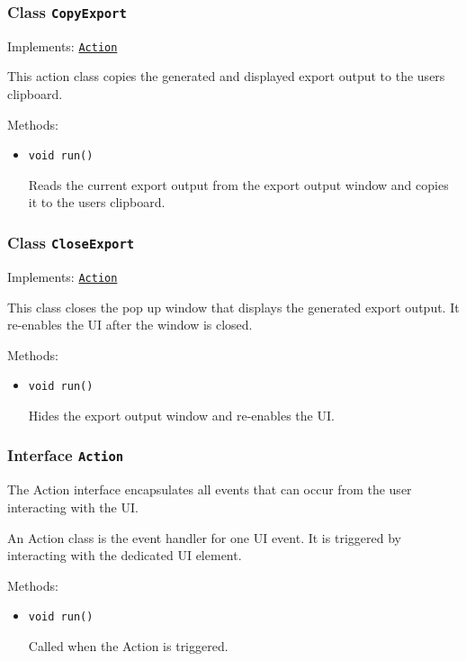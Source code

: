 \subsubsection{Class \texttt{CopyExport}}
\label{type:edu.kit.wavelength.client.view.action.CopyExport}
Implements: \texttt{\hyperref[type:edu.kit.wavelength.client.view.action.Action]{Action}}

This action class copies the generated and displayed export output to the
 users clipboard.

Methods:
\begin{itemize}
\item \texttt{void run()}

Reads the current export output from the export output window and copies it
 to the users clipboard.

\end{itemize}

\subsubsection{Class \texttt{CloseExport}}
\label{type:edu.kit.wavelength.client.view.action.CloseExport}
Implements: \texttt{\hyperref[type:edu.kit.wavelength.client.view.action.Action]{Action}}

This class closes the pop up window that displays the generated export
 output. It re-enables the UI after the window is closed.

Methods:
\begin{itemize}
\item \texttt{void run()}

Hides the export output window and re-enables the UI.

\end{itemize}

\subsubsection{Interface \texttt{Action}}
\label{type:edu.kit.wavelength.client.view.action.Action}
The Action interface encapsulates all events that can occur from the user
 interacting with the UI.
 
 An Action class is the event handler for one UI event. It is triggered by
 interacting with the dedicated UI element.

Methods:
\begin{itemize}
\item \texttt{void run()}

Called when the Action is triggered.

\end{itemize}

